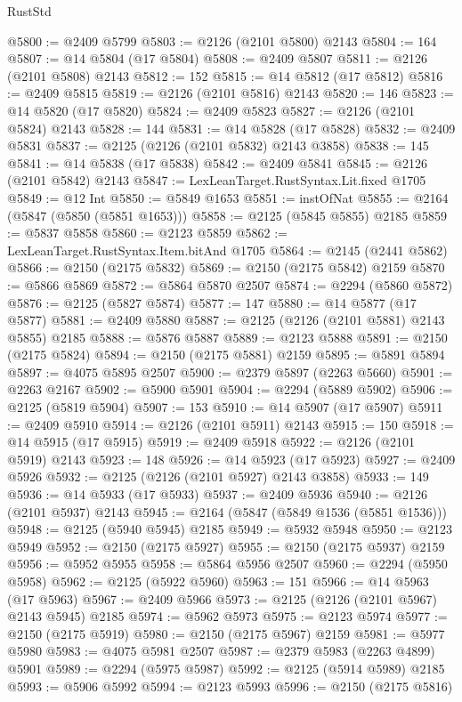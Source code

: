 \begin{lexlean}{RustStd}
\begin{coremodule}
@5800 := @2409 @5799
@5803 := @2126 (@2101 @5800) @2143
@5804 := 164
@5807 := @14 @5804 (@17 @5804)
@5808 := @2409 @5807
@5811 := @2126 (@2101 @5808) @2143
@5812 := 152
@5815 := @14 @5812 (@17 @5812)
@5816 := @2409 @5815
@5819 := @2126 (@2101 @5816) @2143
@5820 := 146
@5823 := @14 @5820 (@17 @5820)
@5824 := @2409 @5823
@5827 := @2126 (@2101 @5824) @2143
@5828 := 144
@5831 := @14 @5828 (@17 @5828)
@5832 := @2409 @5831
@5837 := @2125 (@2126 (@2101 @5832) @2143 @3858)
@5838 := 145
@5841 := @14 @5838 (@17 @5838)
@5842 := @2409 @5841
@5845 := @2126 (@2101 @5842) @2143
@5847 := LexLeanTarget.RustSyntax.Lit.fixed @1705
@5849 := @12 Int
@5850 := @5849 @1653
@5851 := instOfNat
@5855 := @2164 (@5847 (@5850 (@5851 @1653)))
@5858 := @2125 (@5845 @5855) @2185
@5859 := @5837 @5858
@5860 := @2123 @5859
@5862 := LexLeanTarget.RustSyntax.Item.bitAnd @1705
@5864 := @2145 (@2441 @5862)
@5866 := @2150 (@2175 @5832)
@5869 := @2150 (@2175 @5842) @2159
@5870 := @5866 @5869
@5872 := @5864 @5870 @2507
@5874 := @2294 (@5860 @5872)
@5876 := @2125 (@5827 @5874)
@5877 := 147
@5880 := @14 @5877 (@17 @5877)
@5881 := @2409 @5880
@5887 := @2125 (@2126 (@2101 @5881) @2143 @5855) @2185
@5888 := @5876 @5887
@5889 := @2123 @5888
@5891 := @2150 (@2175 @5824)
@5894 := @2150 (@2175 @5881) @2159
@5895 := @5891 @5894
@5897 := @4075 @5895 @2507
@5900 := @2379 @5897 (@2263 @5660)
@5901 := @2263 @2167
@5902 := @5900 @5901
@5904 := @2294 (@5889 @5902)
@5906 := @2125 (@5819 @5904)
@5907 := 153
@5910 := @14 @5907 (@17 @5907)
@5911 := @2409 @5910
@5914 := @2126 (@2101 @5911) @2143
@5915 := 150
@5918 := @14 @5915 (@17 @5915)
@5919 := @2409 @5918
@5922 := @2126 (@2101 @5919) @2143
@5923 := 148
@5926 := @14 @5923 (@17 @5923)
@5927 := @2409 @5926
@5932 := @2125 (@2126 (@2101 @5927) @2143 @3858)
@5933 := 149
@5936 := @14 @5933 (@17 @5933)
@5937 := @2409 @5936
@5940 := @2126 (@2101 @5937) @2143
@5945 := @2164 (@5847 (@5849 @1536 (@5851 @1536)))
@5948 := @2125 (@5940 @5945) @2185
@5949 := @5932 @5948
@5950 := @2123 @5949
@5952 := @2150 (@2175 @5927)
@5955 := @2150 (@2175 @5937) @2159
@5956 := @5952 @5955
@5958 := @5864 @5956 @2507
@5960 := @2294 (@5950 @5958)
@5962 := @2125 (@5922 @5960)
@5963 := 151
@5966 := @14 @5963 (@17 @5963)
@5967 := @2409 @5966
@5973 := @2125 (@2126 (@2101 @5967) @2143 @5945) @2185
@5974 := @5962 @5973
@5975 := @2123 @5974
@5977 := @2150 (@2175 @5919)
@5980 := @2150 (@2175 @5967) @2159
@5981 := @5977 @5980
@5983 := @4075 @5981 @2507
@5987 := @2379 @5983 (@2263 @4899) @5901
@5989 := @2294 (@5975 @5987)
@5992 := @2125 (@5914 @5989) @2185
@5993 := @5906 @5992
@5994 := @2123 @5993
@5996 := @2150 (@2175 @5816)

\end{coremodule}
\end{lexlean}
